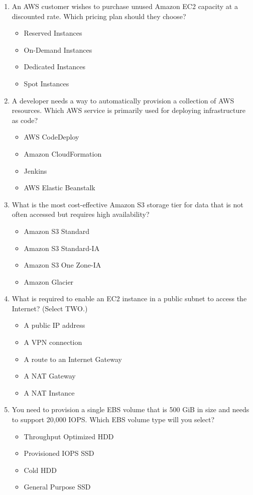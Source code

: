 \begin{enumerate}
	\item An AWS customer wishes to purchase unused Amazon EC2 capacity at a discounted rate. Which pricing plan should they choose?
	\begin{itemize}
		\item Reserved Instances
		\item On-Demand Instances
		\item Dedicated Instances
		\item Spot Instances
	\end{itemize}

	\item A developer needs a way to automatically provision a collection of AWS resources. Which AWS service is primarily used for deploying infrastructure as code?
	\begin{itemize}
		\item AWS CodeDeploy
		\item Amazon CloudFormation
		\item Jenkins
		\item AWS Elastic Beanstalk
	\end{itemize}

	\item What is the most cost-effective Amazon S3 storage tier for data that is not often accessed but requires high availability?
	\begin{itemize}
		\item Amazon S3 Standard
		\item Amazon S3 Standard-IA
		\item Amazon S3 One Zone-IA
		\item Amazon Glacier
	\end{itemize}

	\item What is required to enable an EC2 instance in a public subnet to access the Internet? (Select TWO.)
	\begin{itemize}
		\item A public IP address
		\item A VPN connection
		\item A route to an Internet Gateway
		\item A NAT Gateway
		\item A NAT Instance
	\end{itemize}

	\item You need to provision a single EBS volume that is 500 GiB in size and needs to support 20,000 IOPS. Which EBS volume type will you select?
	\begin{itemize}
		\item Throughput Optimized HDD
		\item Provisioned IOPS SSD
		\item Cold HDD
		\item General Purpose SSD
	\end{itemize}


\end{enumerate}
